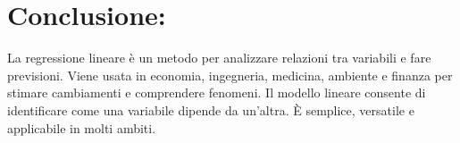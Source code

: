 \documentclass[12pt]{article}
\begin{document}
\section*{Conclusione:}
La regressione lineare è un metodo per analizzare relazioni tra variabili e fare previsioni. Viene usata in economia, ingegneria, medicina, ambiente e finanza 
per stimare cambiamenti e comprendere fenomeni. Il modello lineare consente di identificare come una variabile dipende da un'altra. È semplice, versatile e applicabile 
in molti ambiti.
\end{document}
